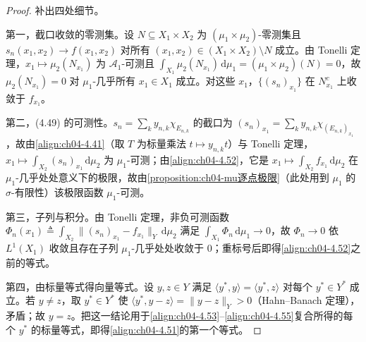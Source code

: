 \documentclass[../../main.tex]{subfiles}%
\begin{document}
\begin{proof}
补出四处细节。

第一，截口收敛的零测集。设 $N\subseteq X_1\times X_2$ 为 $(\mu_1\times\mu_2)$-零测集且 $s_n(x_1,x_2)\to f(x_1,x_2)$ 对所有 $(x_1,x_2)\in(X_1\times X_2)\setminus N$ 成立。由 Tonelli 定理，$x_1\mapsto\mu_2(N_{x_1})$ 为 $\mathcal{A}_1$-可测且 $\int_{X_1}\mu_2(N_{x_1})\,\mathrm{d}\mu_1=(\mu_1\times\mu_2)(N)=0$，故 $\mu_2(N_{x_1})=0$ 对 $\mu_1$-几乎所有 $x_1\in X_1$ 成立。对这些 $x_1$，$\{(s_n)_{x_1}\}$ 在 $N_{x_1}^c$ 上收敛于 $f_{x_1}$。

第二，(4.49) 的可测性。$s_n=\sum_ky_{n,k}\chi_{E_{n,k}}$ 的截口为 $(s_n)_{x_1}=\sum_ky_{n,k}\chi_{(E_{n,k})_{x_1}}$，故由\eqref{align:ch04-4.41}（取 $T$ 为标量乘法 $t\mapsto y_{n,k}t$）与 Tonelli 定理，$x_1\mapsto\int_{X_2}(s_n)_{x_1}\,\mathrm{d}\mu_2$ 为 $\mu_1$-可测；由\eqref{align:ch04-4.52}，它是 $x_1\mapsto\int_{X_2}f_{x_1}\,\mathrm{d}\mu_2$ 在 $\mu_1$-几乎处处意义下的极限，故由\cref{proposition:ch04-mu逐点极限}（此处用到 $\mu_1$ 的 $\sigma$-有限性）该极限函数 $\mu_1$-可测。

第三，子列与积分。由 Tonelli 定理，非负可测函数 $\Phi_n(x_1)\triangleq\int_{X_2}\|(s_n)_{x_1}-f_{x_1}\|_Y\,\mathrm{d}\mu_2$ 满足 $\int_{X_1}\Phi_n\,\mathrm{d}\mu_1\to0$，故 $\Phi_n\to0$ 依 $L^1(X_1)$ 收敛且存在子列 $\mu_1$-几乎处处收敛于 $0$；重标号后即得\eqref{align:ch04-4.52}之前的等式。

第四，由标量等式得向量等式。设 $y,z\in Y$ 满足 $\langle y^*,y\rangle=\langle y^*,z\rangle$ 对每个 $y^*\in Y^*$ 成立。若 $y\neq z$，取 $y^*\in Y^*$ 使 $\langle y^*,y-z\rangle=\|y-z\|_Y>0$（Hahn--Banach 定理），矛盾；故 $y=z$。把这一结论用于\eqref{align:ch04-4.53}--\eqref{align:ch04-4.55}复合所得的每个 $y^*$ 的标量等式，即得\eqref{align:ch04-4.51}的第一个等式。
\end{proof}
\end{document}
